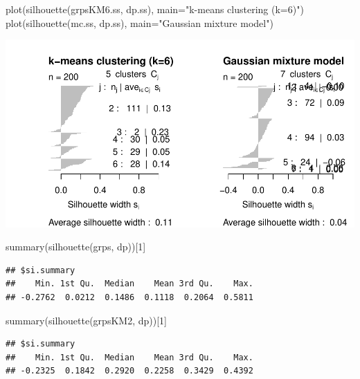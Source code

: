 \documentclass[
]{article}
\newenvironment{Shaded}{\begin{snugshade}}{\end{snugshade}}
\newcommand{\AttributeTok}[1]{\textcolor[rgb]{0.77,0.63,0.00}{#1}}
\newcommand{\DecValTok}[1]{\textcolor[rgb]{0.00,0.00,0.81}{#1}}
\newcommand{\FunctionTok}[1]{\textcolor[rgb]{0.00,0.00,0.00}{#1}}
\newcommand{\NormalTok}[1]{#1}
\newcommand{\StringTok}[1]{\textcolor[rgb]{0.31,0.60,0.02}{#1}}
\begin{document}
\begin{Shaded}
\begin{Highlighting}[]
\FunctionTok{plot}\NormalTok{(}\FunctionTok{silhouette}\NormalTok{(grpsKM6.ss, dp.ss), }\AttributeTok{main=}\StringTok{"k{-}means clustering (k=6)"}\NormalTok{)}
\FunctionTok{plot}\NormalTok{(}\FunctionTok{silhouette}\NormalTok{(mc.ss, dp.ss), }\AttributeTok{main=}\StringTok{"Gaussian mixture model"}\NormalTok{)}
\end{Highlighting}
\end{Shaded}

\includegraphics{Influence_factors_files/figure-latex/3.11_ca_comparison_munic-3.pdf}

\begin{Shaded}
\begin{Highlighting}[]
\FunctionTok{summary}\NormalTok{(}\FunctionTok{silhouette}\NormalTok{(grps, dp))[}\DecValTok{1}\NormalTok{]}
\end{Highlighting}
\end{Shaded}

\begin{verbatim}
## $si.summary
##    Min. 1st Qu.  Median    Mean 3rd Qu.    Max. 
## -0.2762  0.0212  0.1486  0.1118  0.2064  0.5811
\end{verbatim}

\begin{Shaded}
\begin{Highlighting}[]
\FunctionTok{summary}\NormalTok{(}\FunctionTok{silhouette}\NormalTok{(grpsKM2, dp))[}\DecValTok{1}\NormalTok{]}
\end{Highlighting}
\end{Shaded}

\begin{verbatim}
## $si.summary
##    Min. 1st Qu.  Median    Mean 3rd Qu.    Max. 
## -0.2325  0.1842  0.2920  0.2258  0.3429  0.4392
\end{verbatim}
\end{document}
